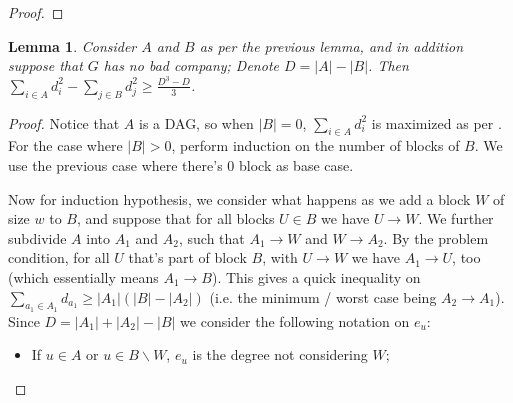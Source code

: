 \documentclass[11pt]{article}
\newcommand{\<}{\langle}
\renewcommand{\>}{\rangle}
\newtheorem{lemma}{Lemma}
\begin{document}
\begin{enumerate}
\begin{proof}
        \end{proof}
        
        \begin{lemma}\label{lmm:sq_diff}
        	Consider $A$ and $B$ as per the previous lemma, 
        	and in addition suppose that $G$ has no bad company; 
        	Denote $D = |A| - |B|$. 
        	Then $\sum_{i\in A} d_i^2 - \sum_{j\in B} d_j^2\ge \frac{D^3 - D}{3}$. 
        \end{lemma}
        
        \begin{proof}
        	Notice that $A$ is a DAG, so when $|B|=0$, $\sum_{i\in A} d_i^2$ is maximized as per . 
        	For the case where $|B| > 0$, perform induction on the number of blocks of $B$. 
        	We use the previous case where there's 0 block as base case. 
        	
        	\iffalse 
        	For one block, we have either $A\to B$ or $B\to A$.
        	We now consider the following decomposition of $d_a = e_a\pm |B|$, $e_a$ being the nett degree within $A$ only 
        	(notice that $\sum e_a = 0$). 
        	Also $d_b = e_b \mp |A|$, $e_b$ the nett degree within $B$ only. Then we have 
        	\[
        	\sum_{a\in A} d_a^2 - \sum_{b\in B} d_b^2
        	=\sum_{a\in A} (e_a\pm |B|)^2 - \sum_{b\in B} (e_b \mp |A|)^2
        	=\sum_{a\in A} e_a^2 - \sum_{b\in B} e_b^2 + |A|\cdot |B|^2 - |B|\cdot |A|^2
        	\pm 2 |B|\sum e_a \pm 2 |A|\sum e_b
        	\]
        	\[
        	\ge  \frac{|A|^3 - |A|}{3} -  \frac{|B|^3 - |B|}{3} + |A|\cdot |B|^2 - |B|\cdot |A|^2
        	=\frac{(|A| - |B|)^3 - (|A| - |B|)}{3}
        	\]
        	where the inequality is due to that $\sum e_a^2$ attains the maximal (equality) case of an earlier lemma and $\sum e_b^2$ is bounded also by \prettyref{lmm:sq_deg}. 
        	\fi 
        	
        	Now for induction hypothesis, we consider what happens as we add a block $W$ of size $w$ to $B$, and suppose that for all blocks $U\in B$ we have $U\to W$. 
        	We further subdivide $A$ into $A_1$ and $A_2$, such that $A_1\to W$ and $W\to A_2$. 
        	By the problem condition, for all $U$ that's part of block $B$, with $U\to W$ we have $A_1\to U$, too (which essentially means $A_1\to B$). 
        	This gives a quick inequality on $\sum_{a_1\in A_1} d_{a_1}\ge |A_1|(|B| - |A_2|)$ (i.e. the minimum / worst case being $A_2\to A_1$). 
        	Since $D = |A_1|+ |A_2| - |B|$ we consider the following notation on $e_u$: 
        	\begin{itemize}
        		\item If $u\in A$ or $u\in B\backslash W$, $e_u$ is the degree not considering $W$; 
        		

\end{itemize}
\end{proof}
\end{enumerate}
\end{document}
